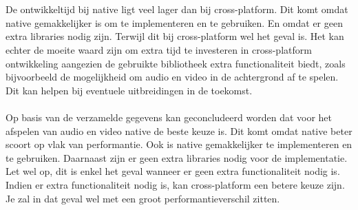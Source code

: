 \\\\
De ontwikkeltijd bij
native ligt veel lager dan bij cross-platform. Dit komt omdat native gemakkelijker is om te implementeren en te gebruiken.
En omdat er geen extra libraries nodig zijn. Terwijl dit bij cross-platform wel het geval is.
Het kan echter de moeite waard zijn om extra tijd te investeren in cross-platform ontwikkeling 
aangezien de gebruikte bibliotheek extra functionaliteit biedt, zoals bijvoorbeeld de 
mogelijkheid om audio en video in de achtergrond af te spelen. Dit kan helpen bij eventuele 
uitbreidingen in de toekomst.
\\\\
Op basis van de verzamelde gegevens kan geconcludeerd worden dat voor het afspelen van audio en video native de beste keuze is.
Dit komt omdat native beter scoort op vlak van performantie. Ook is native gemakkelijker te implementeren
en te gebruiken. Daarnaast zijn er geen extra libraries nodig voor de implementatie. Let wel op, dit is enkel het geval
wanneer er geen extra functionaliteit nodig is. Indien er extra functionaliteit nodig is, kan
cross-platform een betere keuze zijn. Je zal in dat geval wel met een groot performantieverschil zitten.
















